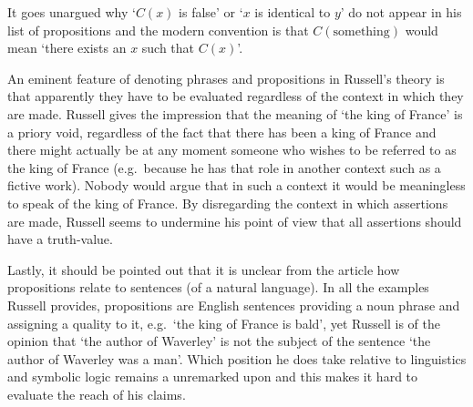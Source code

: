 \documentclass{article}
\begin{document}
It goes unargued why `$C(x)$ is false' or `$x$ is
identical to $y$' do not appear in his list of propositions and the modern
convention is that $C(\text{something})$ would mean `there exists an $x$ such
that $C(x)$'. 

An eminent feature of denoting phrases and propositions in Russell's theory is 
that apparently they have to be evaluated regardless of the context in which 
they are made. Russell gives the impression that the meaning of `the king of 
France' is a priory void, regardless of the fact that there has been a king of 
France and there might actually be at any moment someone who wishes to be 
referred to as the king of France (e.g.~because he has that role in another
context such as a fictive work). Nobody would argue that in such a context it
would be meaningless to speak of the king of France. By disregarding
the context in which assertions are made, Russell seems to undermine his point
of view that all assertions should have a truth-value.

Lastly, it should be pointed out that it is unclear from the article how 
propositions relate to sentences (of a natural language). In
all the examples Russell provides, propositions are English sentences providing
a noun phrase and assigning a quality to it, e.g.~`the king of France is bald',
yet Russell is of the opinion that `the author of Waverley' is not
the subject of the sentence `the author of Waverley was a man'. Which position
he does take relative to linguistics and symbolic logic remains a unremarked
upon and this makes it hard to evaluate the reach of his claims.
\end{document}
